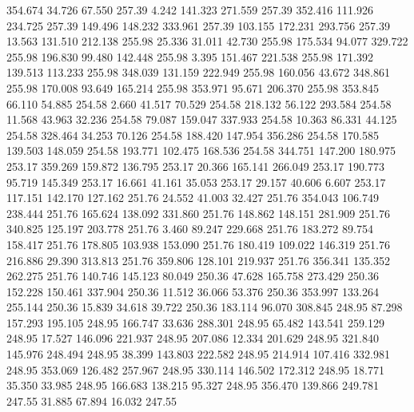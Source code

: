  354.674   34.726   67.550       257.39
   4.242  141.323  271.559       257.39
 352.416  111.926  234.725       257.39
 149.496  148.232  333.961       257.39
 103.155  172.231  293.756       257.39
  13.563  131.510  212.138       255.98
  25.336   31.011   42.730       255.98
 175.534   94.077  329.722       255.98
 196.830   99.480  142.448       255.98
   3.395  151.467  221.538       255.98
 171.392  139.513  113.233       255.98
 348.039  131.159  222.949       255.98
 160.056   43.672  348.861       255.98
 170.008   93.649  165.214       255.98
 353.971   95.671  206.370       255.98
 353.845   66.110   54.885       254.58
   2.660   41.517   70.529       254.58
 218.132   56.122  293.584       254.58
  11.568   43.963   32.236       254.58
  79.087  159.047  337.933       254.58
  10.363   86.331   44.125       254.58
 328.464   34.253   70.126       254.58
 188.420  147.954  356.286       254.58
 170.585  139.503  148.059       254.58
 193.771  102.475  168.536       254.58
 344.751  147.200  180.975       253.17
 359.269  159.872  136.795       253.17
  20.366  165.141  266.049       253.17
 190.773   95.719  145.349       253.17
  16.661   41.161   35.053       253.17
  29.157   40.606    6.607       253.17
 117.151  142.170  127.162       251.76
  24.552   41.003   32.427       251.76
 354.043  106.749  238.444       251.76
 165.624  138.092  331.860       251.76
 148.862  148.151  281.909       251.76
 340.825  125.197  203.778       251.76
   3.460   89.247  229.668       251.76
 183.272   89.754  158.417       251.76
 178.805  103.938  153.090       251.76
 180.419  109.022  146.319       251.76
 216.886   29.390  313.813       251.76
 359.806  128.101  219.937       251.76
 356.341  135.352  262.275       251.76
 140.746  145.123   80.049       250.36
  47.628  165.758  273.429       250.36
 152.228  150.461  337.904       250.36
  11.512   36.066   53.376       250.36
 353.997  133.264  255.144       250.36
  15.839   34.618   39.722       250.36
 183.114   96.070  308.845       248.95
  87.298  157.293  195.105       248.95
 166.747   33.636  288.301       248.95
  65.482  143.541  259.129       248.95
  17.527  146.096  221.937       248.95
 207.086   12.334  201.629       248.95
 321.840  145.976  248.494       248.95
  38.399  143.803  222.582       248.95
 214.914  107.416  332.981       248.95
 353.069  126.482  257.967       248.95
 330.114  146.502  172.312       248.95
  18.771   35.350   33.985       248.95
 166.683  138.215   95.327       248.95
 356.470  139.866  249.781       247.55
  31.885   67.894   16.032       247.55
